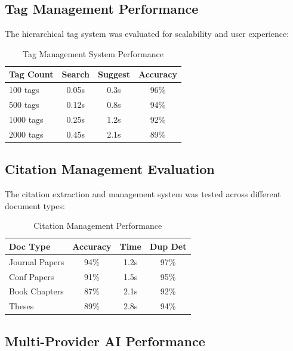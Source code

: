 \documentclass[conference]{IEEEtran}
\begin{document}
\subsection{Tag Management Performance}

The hierarchical tag system was evaluated for scalability and user experience:

\begin{table}[htbp]
\caption{Tag Management System Performance}
\begin{center}
\begin{tabular}{|l|c|c|c|}
\hline
\textbf{Tag Count} & \textbf{Search} & \textbf{Suggest} & \textbf{Accuracy} \\
\hline
100 tags & 0.05s & 0.3s & 96\% \\
500 tags & 0.12s & 0.8s & 94\% \\
1000 tags & 0.25s & 1.2s & 92\% \\
2000 tags & 0.45s & 2.1s & 89\% \\
\hline
\end{tabular}
\end{center}
\label{tab:tag_performance}
\end{table}

\subsection{Citation Management Evaluation}

The citation extraction and management system was tested across different document types:

\begin{table}[htbp]
\caption{Citation Management Performance}
\begin{center}
\begin{tabular}{|l|c|c|c|}
\hline
\textbf{Doc Type} & \textbf{Accuracy} & \textbf{Time} & \textbf{Dup Det} \\
\hline
Journal Papers & 94\% & 1.2s & 97\% \\
Conf Papers & 91\% & 1.5s & 95\% \\
Book Chapters & 87\% & 2.1s & 92\% \\
Theses & 89\% & 2.8s & 94\% \\
\hline
\end{tabular}
\end{center}
\label{tab:citation_performance}
\end{table}

\subsection{Multi-Provider AI Performance}
\end{document}
